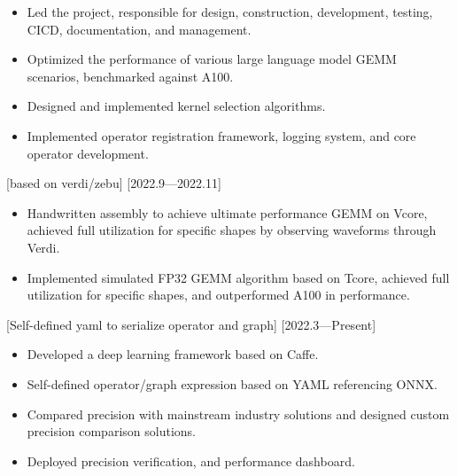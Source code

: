 \documentclass{resume}
\begin{document}
\begin{itemize}
  \item Led the project, responsible for design, construction, development, testing, CICD, documentation, and management.
  \item Optimized the performance of various large language model GEMM scenarios, benchmarked against A100. 
  \item Designed and implemented kernel selection algorithms.
  \item Implemented operator registration framework, logging system, and core operator development.
\end{itemize}

[based on verdi/zebu]
[2022.9—2022.11]

\begin{itemize}
  \item Handwritten assembly to achieve ultimate performance GEMM on Vcore, achieved full utilization for specific shapes by observing waveforms through Verdi.
  \item Implemented simulated FP32 GEMM algorithm based on Tcore, achieved full utilization for specific shapes, and outperformed A100 in performance.
\end{itemize}

[Self-defined yaml to serialize operator and graph]
[2022.3—Present]

\begin{itemize}
  \item Developed a deep learning framework based on Caffe.
  \item Self-defined operator/graph expression based on YAML referencing ONNX.
  \item Compared precision with mainstream industry solutions and designed custom precision comparison solutions.
  \item Deployed precision verification, and performance dashboard.
\end{itemize}
\end{document}
